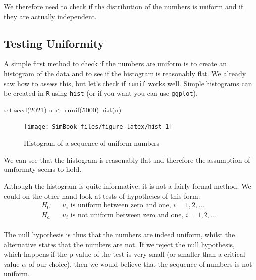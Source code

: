 \documentclass[
]{book}
\newenvironment{Shaded}{\begin{snugshade}}{\end{snugshade}}
\newcommand{\DecValTok}[1]{\textcolor[rgb]{0.00,0.00,0.81}{#1}}
\newcommand{\FunctionTok}[1]{\textcolor[rgb]{0.00,0.00,0.00}{#1}}
\newcommand{\NormalTok}[1]{#1}
\newcommand{\OtherTok}[1]{\textcolor[rgb]{0.56,0.35,0.01}{#1}}
\begin{document}
We therefore need to check if the distribution of the numbers is uniform and if they are actually independent.

\hypertarget{testing-uniformity}{%
\subsection{Testing Uniformity}\label{testing-uniformity}}

A simple first method to check if the numbers are uniform is to create an histogram of the data and to see if the histogram is reasonably flat. We already saw how to assess this, but let's check if \texttt{runif} works well. Simple histograms can be created in \texttt{R} using \texttt{hist} (or if you want you can use \texttt{ggplot}).

\begin{Shaded}
\begin{Highlighting}[]
\FunctionTok{set.seed}\NormalTok{(}\DecValTok{2021}\NormalTok{)}
\NormalTok{u }\OtherTok{\textless{}{-}} \FunctionTok{runif}\NormalTok{(}\DecValTok{5000}\NormalTok{)}
\FunctionTok{hist}\NormalTok{(u)}
\end{Highlighting}
\end{Shaded}

\begin{figure}

{\centering \texttt{[image: SimBook\_files/figure-latex/hist-1]} 

}

\caption{Histogram of a sequence of uniform numbers}\label{fig:hist}
\end{figure}

We can see that the histogram is reasonably flat and therefore the assumption of uniformity seems to hold.

Although the histogram is quite informative, it is not a fairly formal method. We could on the other hand look at tests of hypotheses of this form:
\begin{align*}
H_0: & \;\;u_i \mbox{ is uniform between zero and one, } i=1,2,\dots\\
H_a: & \;\;u_i \mbox{ is not uniform between zero and one, } i=1,2,\dots\\
\end{align*}

The null hypothesis is thus that the numbers are indeed uniform, whilst the alternative states that the numbers are not. If we reject the null hypothesis, which happens if the p-value of the test is very small (or smaller than a critical value \(\alpha\) of our choice), then we would believe that the sequence of numbers is not uniform.
\end{document}
